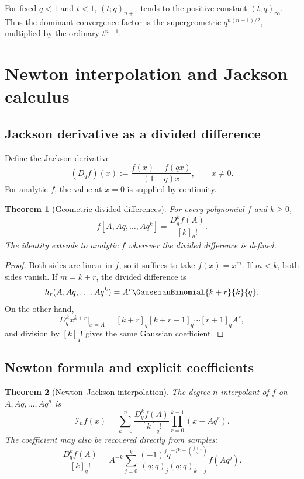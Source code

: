 \documentclass[11pt,oneside]{article}
\numberwithin{equation}{section}
\newtheorem{theorem}{Theorem}[section]
\theoremstyle{definition}
\theoremstyle{remark}
\newcommand{\Ic}{\mathcal I}
\begin{document}
For fixed $q<1$ and $t<1$, $(t;q)_{n+1}$ tends to the positive constant
$(t;q)_\infty$.  Thus the dominant convergence factor is the
supergeometric $q^{n(n+1)/2}$, multiplied by the ordinary $t^{n+1}$.

\section{Newton interpolation and Jackson calculus}

\subsection{Jackson derivative as a divided difference}

Define the Jackson derivative
\begin{equation}
 (D_qf)(x):=\frac{f(x)-f(qx)}{(1-q)x},\qquad x\ne0.
 \label{eq:Jackson}
\end{equation}
For analytic $f$, the value at $x=0$ is supplied by continuity.

\begin{theorem}[Geometric divided differences]
For every polynomial $f$ and $k\ge0$,
\begin{equation}
 f[A,Aq,\ldots,Aq^k]=\frac{D_q^kf(A)}{[k]_q!}.
 \label{eq:divdiff-Jackson}
\end{equation}
The identity extends to analytic $f$ wherever the divided difference is
defined.
\end{theorem}

\begin{proof}
Both sides are linear in $f$, so it suffices to take $f(x)=x^m$.  If $m<k$,
both sides vanish.  If $m=k+r$, the divided difference is
\[
 h_r(A,Aq,\ldots,Aq^k)=A^r\GaussianBinomial{k+r}{k}{q}.
\]
On the other hand,
\[
 D_q^kx^{k+r}\big|_{x=A}
 =[k+r]_q[k+r-1]_q\cdots[r+1]_qA^r,
\]
and division by $[k]_q!$ gives the same Gaussian coefficient.
\end{proof}

\subsection{Newton formula and explicit coefficients}

\begin{theorem}[Newton--Jackson interpolation]
The degree-$n$ interpolant of $f$ on $A,Aq,\ldots,Aq^n$ is
\begin{equation}
 \Ic_nf(x)=\sum_{k=0}^n
 \frac{D_q^kf(A)}{[k]_q!}
 \prod_{r=0}^{k-1}(x-Aq^r).
 \label{eq:Newton-Jackson}
\end{equation}
The coefficient may also be recovered directly from samples:
\begin{equation}
 \frac{D_q^kf(A)}{[k]_q!}
 =A^{-k}\sum_{j=0}^k
 \frac{(-1)^jq^{-jk+\binom{j+1}{2}}}
 {(q;q)_j(q;q)_{k-j}}f(Aq^j).
 \label{eq:Newton-sample-coeff}
\end{equation}
\end{theorem}
\end{document}
